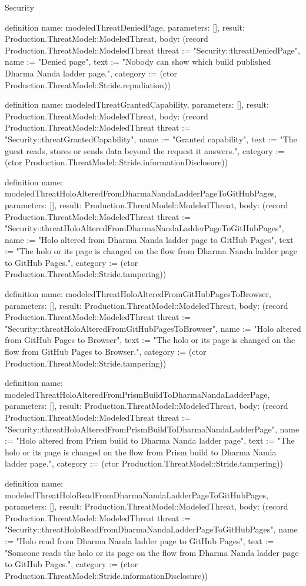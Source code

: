 \begin{lexlean}{Security}
\begin{semanticmodule}
definition{
  name: modeledThreatDeniedPage,
  parameters: [],
  result: Production.ThreatModel::ModeledThreat,
  body: (record Production.ThreatModel::ModeledThreat {threat := "Security::threatDeniedPage", name := "Denied page", text := "Nobody can show which build published Dharma Nanda ladder page.", category := (ctor Production.ThreatModel::Stride.repudiation)})
}

definition{
  name: modeledThreatGrantedCapability,
  parameters: [],
  result: Production.ThreatModel::ModeledThreat,
  body: (record Production.ThreatModel::ModeledThreat {threat := "Security::threatGrantedCapability", name := "Granted capability", text := "The guest reads, stores or sends data beyond the request it answers.", category := (ctor Production.ThreatModel::Stride.informationDisclosure)})
}

definition{
  name: modeledThreatHoloAlteredFromDharmaNandaLadderPageToGitHubPages,
  parameters: [],
  result: Production.ThreatModel::ModeledThreat,
  body: (record Production.ThreatModel::ModeledThreat {threat := "Security::threatHoloAlteredFromDharmaNandaLadderPageToGitHubPages", name := "Holo altered from Dharma Nanda ladder page to GitHub Pages", text := "The holo or its page is changed on the flow from Dharma Nanda ladder page to GitHub Pages.", category := (ctor Production.ThreatModel::Stride.tampering)})
}

definition{
  name: modeledThreatHoloAlteredFromGitHubPagesToBrowser,
  parameters: [],
  result: Production.ThreatModel::ModeledThreat,
  body: (record Production.ThreatModel::ModeledThreat {threat := "Security::threatHoloAlteredFromGitHubPagesToBrowser", name := "Holo altered from GitHub Pages to Browser", text := "The holo or its page is changed on the flow from GitHub Pages to Browser.", category := (ctor Production.ThreatModel::Stride.tampering)})
}

definition{
  name: modeledThreatHoloAlteredFromPrismBuildToDharmaNandaLadderPage,
  parameters: [],
  result: Production.ThreatModel::ModeledThreat,
  body: (record Production.ThreatModel::ModeledThreat {threat := "Security::threatHoloAlteredFromPrismBuildToDharmaNandaLadderPage", name := "Holo altered from Prism build to Dharma Nanda ladder page", text := "The holo or its page is changed on the flow from Prism build to Dharma Nanda ladder page.", category := (ctor Production.ThreatModel::Stride.tampering)})
}

definition{
  name: modeledThreatHoloReadFromDharmaNandaLadderPageToGitHubPages,
  parameters: [],
  result: Production.ThreatModel::ModeledThreat,
  body: (record Production.ThreatModel::ModeledThreat {threat := "Security::threatHoloReadFromDharmaNandaLadderPageToGitHubPages", name := "Holo read from Dharma Nanda ladder page to GitHub Pages", text := "Someone reads the holo or its page on the flow from Dharma Nanda ladder page to GitHub Pages.", category := (ctor Production.ThreatModel::Stride.informationDisclosure)})
}


\end{semanticmodule}
\end{lexlean}
